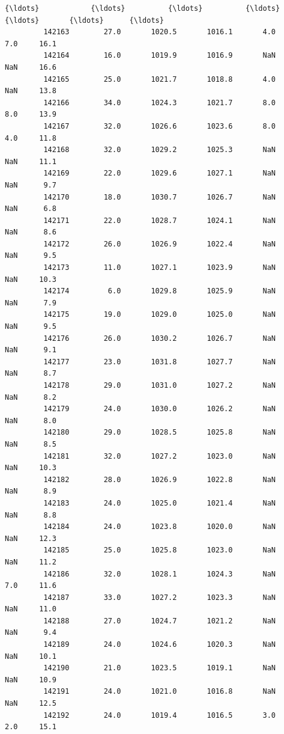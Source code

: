 \documentclass[11pt]{article}
\begin{document}
\begin{Verbatim}[commandchars=\\\{\}]
         {\ldots}            {\ldots}          {\ldots}          {\ldots}       {\ldots}       {\ldots}      {\ldots}   
         142163        27.0       1020.5       1016.1       4.0       7.0     16.1   
         142164        16.0       1019.9       1016.9       NaN       NaN     16.6   
         142165        25.0       1021.7       1018.8       4.0       NaN     13.8   
         142166        34.0       1024.3       1021.7       8.0       8.0     13.9   
         142167        32.0       1026.6       1023.6       8.0       4.0     11.8   
         142168        32.0       1029.2       1025.3       NaN       NaN     11.1   
         142169        22.0       1029.6       1027.1       NaN       NaN      9.7   
         142170        18.0       1030.7       1026.7       NaN       NaN      6.8   
         142171        22.0       1028.7       1024.1       NaN       NaN      8.6   
         142172        26.0       1026.9       1022.4       NaN       NaN      9.5   
         142173        11.0       1027.1       1023.9       NaN       NaN     10.3   
         142174         6.0       1029.8       1025.9       NaN       NaN      7.9   
         142175        19.0       1029.0       1025.0       NaN       NaN      9.5   
         142176        26.0       1030.2       1026.7       NaN       NaN      9.1   
         142177        23.0       1031.8       1027.7       NaN       NaN      8.7   
         142178        29.0       1031.0       1027.2       NaN       NaN      8.2   
         142179        24.0       1030.0       1026.2       NaN       NaN      8.0   
         142180        29.0       1028.5       1025.8       NaN       NaN      8.5   
         142181        32.0       1027.2       1023.0       NaN       NaN     10.3   
         142182        28.0       1026.9       1022.8       NaN       NaN      8.9   
         142183        24.0       1025.0       1021.4       NaN       NaN      8.8   
         142184        24.0       1023.8       1020.0       NaN       NaN     12.3   
         142185        25.0       1025.8       1023.0       NaN       NaN     11.2   
         142186        32.0       1028.1       1024.3       NaN       7.0     11.6   
         142187        33.0       1027.2       1023.3       NaN       NaN     11.0   
         142188        27.0       1024.7       1021.2       NaN       NaN      9.4   
         142189        24.0       1024.6       1020.3       NaN       NaN     10.1   
         142190        21.0       1023.5       1019.1       NaN       NaN     10.9   
         142191        24.0       1021.0       1016.8       NaN       NaN     12.5   
         142192        24.0       1019.4       1016.5       3.0       2.0     15.1   
         

\end{Verbatim}
\end{document}
